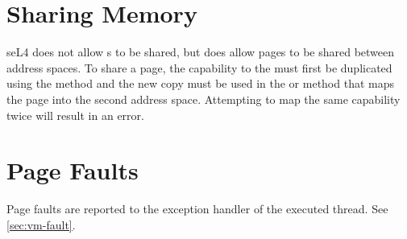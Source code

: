 \section{Sharing Memory}

seL4 does not allow s to be shared, but does allow
pages to be shared between address spaces. 
To share a page, the capability to the 
 must first be
duplicated using the  method and the new copy must
be used in the  \ifxeightsix or  \fi method that maps the page into the second
address space. Attempting to map the same capability
twice will result in an error. 


\section{Page Faults}

Page faults are reported to the exception handler of the executed thread.
See \autoref{sec:vm-fault}.
